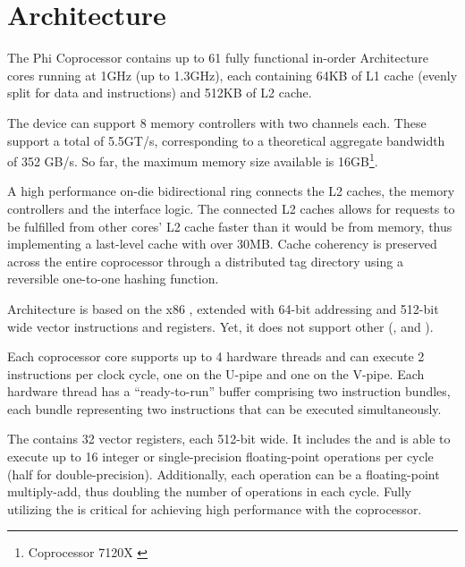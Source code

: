 \documentclass[../thesis]{subfiles}
\begin{document}
	\section{Architecture}
	\label{sec:mic:arch}

	The \intel\xeon Phi Coprocessor contains up to 61 fully functional in-order \intel\mic Architecture cores running at 1GHz (up to 1.3GHz), each containing 64KB of L1 cache (evenly split for data and instructions) and 512KB of L2 cache.

	The device can support 8 memory controllers with two  channels each. These support a total of 5.5GT/s, corresponding to a theoretical aggregate bandwidth of 352 GB/s. So far, the maximum memory size available is 16GB\footnote{\intel\xeonphi Coprocessor 7120X \cite{intel:datasheet:xeonphi}}.

	A high performance on-die bidirectional  ring connects the L2 caches, the memory controllers and the \pcie interface logic. The connected L2 caches allows for requests to be fulfilled from other cores' L2 cache faster than it would be from memory, thus implementing a last-level cache with over 30MB. Cache coherency is preserved across the entire coprocessor through a distributed tag directory using a reversible one-to-one hashing function.

	\intel\mic Architecture is based on the x86 \isa, extended with 64-bit addressing and 512-bit wide \simd vector instructions and registers. Yet, it does not support other \simd\isas (\mmx, \intel\sse and \intel\avx).

	Each coprocessor core supports up to 4 hardware threads and can execute 2 instructions per clock cycle, one on the U-pipe and one on the V-pipe. Each hardware thread has a ``ready-to-run'' buffer comprising two instruction bundles, each bundle representing two instructions that can be executed simultaneously.

	The \vpu contains 32 vector registers, each 512-bit wide. It includes the \emu and is able to execute up to 16 integer or single-precision floating-point operations per cycle (half for double-precision). Additionally, each operation can be a floating-point multiply-add, thus doubling the number of operations in each cycle. Fully utilizing the \vpu is critical for achieving high performance with the coprocessor.
\end{document}
